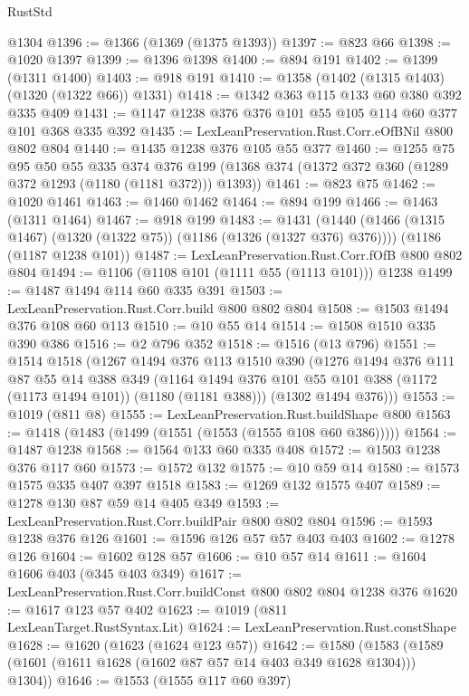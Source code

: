 \begin{lexlean}{RustStd}
\begin{coremodule}
    @1304
@1396 := @1366 (@1369 (@1375 @1393))
@1397 := @823 @66
@1398 := @1020 @1397
@1399 := @1396 @1398
@1400 := @894 @191
@1402 := @1399 (@1311 @1400)
@1403 := @918 @191
@1410 := @1358 (@1402 (@1315 @1403) (@1320 (@1322 @66)) @1331)
@1418 := @1342 @363 @115 @133 @60 @380 @392 @335 @409
@1431 := @1147 @1238 @376 @376 @101 @55 @105 @114 @60 @377 @101 @368 @335 @392
@1435 := LexLeanPreservation.Rust.Corr.eOfBNil @800 @802 @804
@1440 := @1435 @1238 @376 @105 @55 @377
@1460 := @1255
    @75
    @95
    @50
    @55
    @335
    @374
    @376
    @199
    (@1368 @374 (@1372 @372 @360 (@1289 @372 @1293 (@1180 (@1181 @372))) @1393))
@1461 := @823 @75
@1462 := @1020 @1461
@1463 := @1460 @1462
@1464 := @894 @199
@1466 := @1463 (@1311 @1464)
@1467 := @918 @199
@1483 := @1431
    (@1440 (@1466 (@1315 @1467) (@1320 (@1322 @75)) (@1186 (@1326 (@1327 @376) @376))))
    (@1186 (@1187 @1238 @101))
@1487 := LexLeanPreservation.Rust.Corr.fOfB @800 @802 @804
@1494 := @1106 (@1108 @101 (@1111 @55 (@1113 @101))) @1238
@1499 := @1487 @1494 @114 @60 @335 @391
@1503 := LexLeanPreservation.Rust.Corr.build @800 @802 @804
@1508 := @1503 @1494 @376 @108 @60 @113
@1510 := @10 @55 @14
@1514 := @1508 @1510 @335 @390 @386
@1516 := @2 @796 @352
@1518 := @1516 (@13 @796)
@1551 := @1514
    @1518
    (@1267
      @1494
      @376
      @113
      @1510
      @390
      (@1276
        @1494
        @376
        @111
        @87
        @55
        @14
        @388
        @349
        (@1164 @1494 @376 @101 @55 @101 @388 (@1172 (@1173 @1494 @101)) (@1180 (@1181 @388)))
        (@1302 @1494 @376)))
@1553 := @1019 (@811 @8)
@1555 := LexLeanPreservation.Rust.buildShape @800
@1563 := @1418 (@1483 (@1499 (@1551 (@1553 (@1555 @108 @60 @386)))))
@1564 := @1487 @1238
@1568 := @1564 @133 @60 @335 @408
@1572 := @1503 @1238 @376 @117 @60
@1573 := @1572 @132
@1575 := @10 @59 @14
@1580 := @1573 @1575 @335 @407 @397 @1518
@1583 := @1269 @132 @1575 @407
@1589 := @1278 @130 @87 @59 @14 @405 @349
@1593 := LexLeanPreservation.Rust.Corr.buildPair @800 @802 @804
@1596 := @1593 @1238 @376 @126
@1601 := @1596 @126 @57 @57 @403 @403
@1602 := @1278 @126
@1604 := @1602 @128 @57
@1606 := @10 @57 @14
@1611 := @1604 @1606 @403 (@345 @403 @349)
@1617 := LexLeanPreservation.Rust.Corr.buildConst @800 @802 @804 @1238 @376
@1620 := @1617 @123 @57 @402
@1623 := @1019 (@811 LexLeanTarget.RustSyntax.Lit)
@1624 := LexLeanPreservation.Rust.constShape
@1628 := @1620 (@1623 (@1624 @123 @57))
@1642 := @1580 (@1583 (@1589 (@1601 (@1611 @1628 (@1602 @87 @57 @14 @403 @349 @1628 @1304))) @1304))
@1646 := @1553 (@1555 @117 @60 @397)

\end{coremodule}
\end{lexlean}
